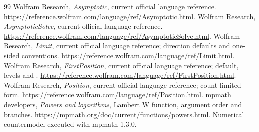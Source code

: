 \documentclass[11pt,letterpaper]{article}
\newcommand{\code}[1]{\texttt{\detokenize{#1}}}
\begin{document}
\begin{thebibliography}{99}
 Wolfram Research, \emph{Asymptotic}, current official language reference. \url{https://reference.wolfram.com/language/ref/Asymptotic.html}.
 Wolfram Research, \emph{AsymptoticSolve}, current official language reference. \url{https://reference.wolfram.com/language/ref/AsymptoticSolve.html}.
 Wolfram Research, \emph{Limit}, current official language reference; direction defaults and one-sided conventions. \url{https://reference.wolfram.com/language/ref/Limit.html}.
 Wolfram Research, \emph{FirstPosition}, current official language reference; default, levels and \code{Heads}. \url{https://reference.wolfram.com/language/ref/FirstPosition.html}.
 Wolfram Research, \emph{Position}, current official language reference; count-limited form. \url{https://reference.wolfram.com/language/ref/Position.html}.
 mpmath developers, \emph{Powers and logarithms}, Lambert W function, argument order and branches. \url{https://mpmath.org/doc/current/functions/powers.html}. Numerical countermodel executed with mpmath 1.3.0.
\end{thebibliography}
\end{document}
